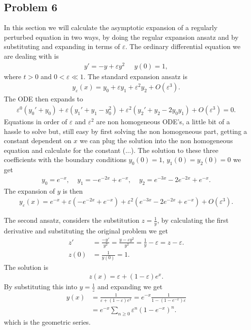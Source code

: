 \documentclass[a4paper]{article}
\newcommand{\eps}{\varepsilon}
\begin{document}
\subsection{Problem 6}
In this section we will calculate the asymptotic expansion of a regularly
perturbed equation in two ways, by doing the regular expansion ansatz and by
substituting and expanding in terms of $\eps$. The ordinary differential
equation we are dealing with is
\begin{align}
    y' = -y + \eps y^2 \;\;\;\;\; y(0) = 1,
\end{align}
where $t > 0$ and $0 < \eps \ll 1$. The standard expansion ansatz is
\begin{align}
y_\eps(x) = y_0 + \eps y_1 + \eps^2 y_2 + O(\eps^3).
\end{align}
The ODE then expands to
\begin{align}
    \eps^0(y_0' + y_0) + \eps(y_1' + y_1 - y_0^2) + \eps^2(y_2' + y_2 -
    2y_0y_1) + O(\eps^3) = 0.
\end{align}
Equations in order of $\eps$ and $\eps^2$ are non homogeneous ODE's, a little
bit of a hassle to solve but, still easy by first solving the non homogeneous
part, getting a constant dependent on $x$ we can plug the solution into the
non homogeneous equation and calculate for the constant (...). The solution to
these three coefficients with the boundary conditions $y_0(0) = 1$, $y_1(0) =
y_2(0) = 0$ we get
\begin{align}
    y_0 = e^{-x}, \;\;\;\; y_1 = -e^{-2x} + e^{-x}, \;\;\;\; y_2 = e^{-3x} -
    2e^{-2x} + e^{-x}.
\end{align}
The expansion of $y$ is then
\begin{align}
    y_\eps (x) = e^{-x} + \eps(-e^{-2x} + e^{-x}) + \eps^2(e^{-3x} - 2e^{-2x}
+ e^{-x}) + O(\eps^3).  \end{align}

The second ansatz, considers the substitution $z = \frac{1}{y}$, by
calculating the first derivative and substituting the original problem we
get
\begin{align}
    z' &= \frac{-y'}{y^2} = \frac{y-\eps y^2}{y^2} = \frac{1}{y} - \eps = z -
    \eps. \\
    z(0) &= \frac{1}{y(0)} = 1.
\end{align}
The solution is
\begin{align}
    z(x) = \eps + (1-\eps) e^x.
\end{align}
By substituting this into $y = \frac{1}{z}$ and expanding we get
\begin{align}
    y(x) &= \frac{1}{\eps+(1-\eps)e^x} = e^{-x} \frac{1}{1 - (1- e^{-x})\eps}
    \\
         &= e^{-x} \sum_{n\geq 0} \eps^n(1-e^{-x})^n.
\end{align}
which is the geometric series.
\end{document}
